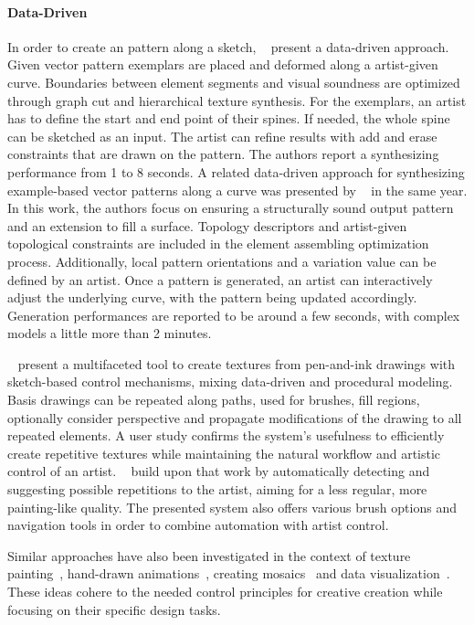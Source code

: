 \paragraph*{Data-Driven}
\label{para:analysis_rulebased_sketchbased_datadriven}
In order to create an pattern along a sketch, \citeauthor*{lu_2014_dds}~\cite{lu_2014_dds} present a data-driven approach. Given vector pattern exemplars are placed and deformed along a artist-given curve. Boundaries between element segments and visual soundness are optimized through graph cut and hierarchical texture synthesis. For the exemplars, an artist has to define the start and end point of their spines. If needed, the whole spine can be sketched as an input. The artist can refine results with add and erase constraints that are drawn on the pattern. The authors report a synthesizing performance from 1 to 8 seconds. A related data-driven approach for synthesizing example-based vector patterns along a curve was presented by \citeauthor*{zhou_2014_tsv}~\cite{zhou_2014_tsv} in the same year. In this work, the authors focus on ensuring a structurally sound output pattern and an extension to fill a surface. Topology descriptors and artist-given topological constraints are included in the element assembling optimization process. Additionally, local pattern orientations and a variation value can be defined by an artist. Once a pattern is generated, an artist can interactively adjust the underlying curve, with the pattern being updated accordingly. Generation performances are reported to be around a few seconds, with complex models a little more than 2 minutes.

\citeauthor*{kazi_2012_vit}~\cite{kazi_2012_vit} present a multifaceted tool to create textures from pen-and-ink drawings with sketch-based control mechanisms, mixing data-driven and procedural modeling. Basis drawings can be repeated along paths, used for brushes, fill regions, optionally consider perspective and propagate modifications of the drawing to all repeated elements. A user study confirms the system's usefulness to efficiently create repetitive textures while maintaining the natural workflow and artistic control of an artist. \citeauthor*{xing_2014_apr}~\cite{xing_2014_apr} build upon that work by automatically detecting and suggesting possible repetitions to the artist, aiming for a less regular, more painting-like quality. The presented system also offers various brush options and navigation tools in order to combine automation with artist control.

Similar approaches have also been investigated in the context of texture painting~\cite{lukac_2013_pft}, hand-drawn animations~\cite{xing_2015_aha}, creating mosaics~\cite{igarashi_2010_dde,abdrashitov_2014_msi} and data visualization~\cite{xia_2018_ddc}. These ideas cohere to the needed control principles for creative creation while focusing on their specific design tasks. 

